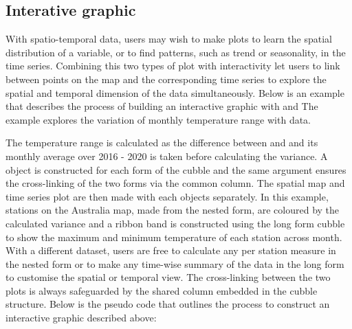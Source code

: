 \documentclass[
]{jss}
\begin{document}
\hypertarget{interative-graphic}{%
\subsection{Interative graphic}\label{interative-graphic}}

With spatio-temporal data, users may wish to make plots to learn the spatial distribution of a variable, or to find patterns, such as trend or seasonality, in the time series. Combining this two types of plot with interactivity let users to link between points on the map and the corresponding time series to explore the spatial and temporal dimension of the data simultaneously. Below is an example that describes the process of building an interactive graphic with  and  The example explores the variation of monthly temperature range with  data.

The temperature range is calculated as the difference between  and  and its monthly average over 2016 - 2020 is taken before calculating the variance. A  object is constructed for each form of the cubble and the same  argument ensures the cross-linking of the two forms via the common  column. The spatial map and time series plot are then made with each  objects separately. In this example, stations on the Australia map, made from the nested form, are coloured by the calculated variance and a ribbon band is constructed using the long form cubble to show the maximum and minimum temperature of each station across month. With a different dataset, users are free to calculate any per station measure in the nested form or to make any time-wise summary of the data in the long form to customise the spatial or temporal view. The cross-linking between the two plots is always safeguarded by the shared  column embedded in the cubble structure. Below is the pseudo code that outlines the process to construct an interactive graphic described above:
\end{document}
